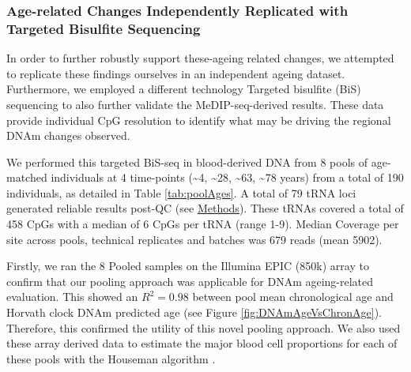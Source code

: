 \documentclass[]{book}
\begin{document}
\hypertarget{age-related-changes-independently-replicated-with-targeted-bisulfite-sequencing}{%
\subsubsection{Age-related Changes Independently Replicated with Targeted Bisulfite Sequencing}\label{age-related-changes-independently-replicated-with-targeted-bisulfite-sequencing}}

In order to further robustly support these-ageing related changes, we attempted to replicate these findings ourselves in an independent ageing dataset.
Furthermore, we employed a different technology Targeted bisulfite (BiS) sequencing to also further validate the MeDIP-seq-derived results.
These data provide individual CpG resolution to identify what may be driving the regional DNAm changes observed.

We performed this targeted BiS-seq in blood-derived DNA from 8 pools of age-matched individuals at 4 time-points (\textasciitilde4, \textasciitilde28, \textasciitilde63, \textasciitilde78 years) from a total of 190 individuals, as detailed in Table \ref{tab:poolAges}.
A total of 79 tRNA loci generated reliable results post-QC (see \protect\hyperlink{targetedBiSseq}{Methods}).
These tRNAs covered a total of 458 CpGs with a median of 6 CpGs per tRNA (range 1-9).
Median Coverage per site across pools, technical replicates and batches was 679 reads (mean 5902).

Firstly, we ran the 8 Pooled samples on the Illumina EPIC (850k) array to confirm that our pooling approach was applicable for DNAm ageing-related evaluation.
This showed an \(R^2 = 0.98\) between pool mean chronological age and Horvath clock DNAm predicted age \citep{Horvath2013}(see Figure \ref{fig:DNAmAgeVsChronAge}).
Therefore, this confirmed the utility of this novel pooling approach.
We also used these array derived data to estimate the major blood cell proportions for each of these pools with the Houseman algorithm \citep{Houseman2012}.
\end{document}
